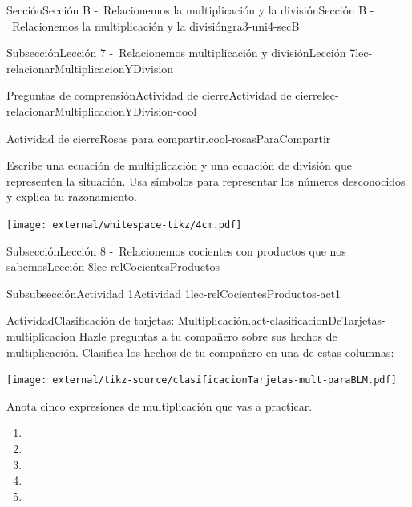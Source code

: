 \begin{sectionptx}{Sección}{Sección B -~Relacionemos la multiplicación y la división}{}{Sección B -~Relacionemos la multiplicación y la división}{}{}{gra3-uni4-secB}
\begin{subsectionptx}{Subsección}{Lección 7 -~Relacionemos multiplicación y división}{}{Lección 7}{}{}{lec-relacionarMultiplicacionYDivision}
\begin{reading-questions-subsubsection}{Preguntas de comprensión}{Actividad de cierre}{}{Actividad de cierre}{}{}{lec-relacionarMultiplicacionYDivision-cool}
\begin{project}{Actividad de cierre}{Rosas para compartir.}{cool-rosasParaCompartir}
\par
Escribe una ecuación de multiplicación y una ecuación de división que representen la situación. Usa símbolos para representar los números desconocidos y explica tu razonamiento.%
\begin{image}{0}{1}{0}{}%
\texttt{[image: external/whitespace-tikz/4cm.pdf]}
\end{image}%
\end{project}%
\end{reading-questions-subsubsection}
\end{subsectionptx}
%
%
\typeout{************************************************}
\typeout{************************************************}
%
\begin{subsectionptx}{Subsección}{Lección 8 -~Relacionemos cocientes con productos que nos sabemos}{}{Lección 8}{}{}{lec-relCocientesProductos}
%
%
\typeout{************************************************}
\typeout{************************************************}
%
\clearpage
\begin{subsubsectionptx}{Subsubsección}{Actividad 1}{}{Actividad 1}{}{}{lec-relCocientesProductos-act1}
\begin{activity}{Actividad}{Clasificación de tarjetas: Multiplicación.}{act-clasificacionDeTarjetas-multiplicacion}%
Hazle preguntas a tu compañero sobre sus hechos de multiplicación. Clasifica los hechos de tu compañero en una de estas columnas:%
\begin{image}{0}{1}{0}{}%
\texttt{[image: external/tikz-source/clasificacionTarjetas-mult-paraBLM.pdf]}
\end{image}%
Anota cinco expresiones de multiplicación que vas a practicar.%
%
\begin{enumerate}
\item{\vspace{0.5cm}}%
\item{\vspace{0.5cm}}%
\item{\vspace{0.5cm}}%
\item{\vspace{0.5cm}}%
\item{\vspace{0.5cm}}%
\end{enumerate}
\end{activity}%
\begin{cutoutpage}

\end{cutoutpage}
\end{subsubsectionptx}
\end{subsectionptx}
\end{sectionptx}
